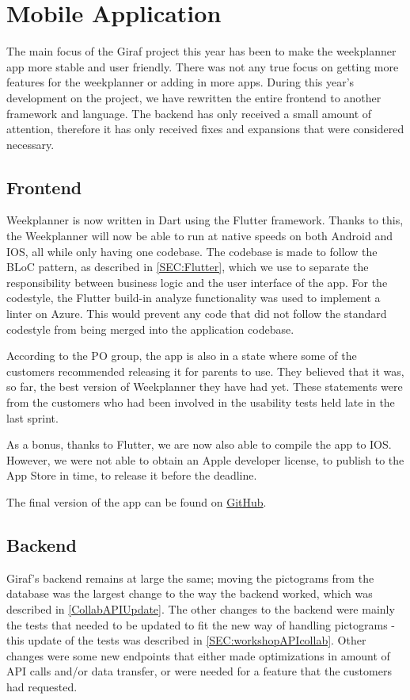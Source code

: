 \section{Mobile Application}
The main focus of the Giraf project this year has been to make the weekplanner app more stable and user friendly.
There was not any true focus on getting more features for the weekplanner or adding in more apps.
During this year's development on the project, we have rewritten the entire frontend to another framework and language.
The backend has only received a small amount of attention, therefore it has only received fixes and expansions that were considered necessary.

\subsection{Frontend}
Weekplanner is now written in Dart using the Flutter framework.
Thanks to this, the Weekplanner will now be able to run at native speeds on both Android and IOS, all while only having one codebase.
The codebase is made to follow the BLoC pattern, as described in \autoref{SEC:Flutter}, which we use to separate the responsibility between business logic and the user interface of the app. 
For the codestyle, the Flutter build-in analyze functionality was used to implement a linter on Azure. 
This would prevent any code that did not follow the standard codestyle from being merged into the application codebase.

According to the PO group, the app is also in a state where some of the customers recommended releasing it for parents to use.
They believed that it was, so far, the best version of Weekplanner they have had yet.
These statements were from the customers who had been involved in the usability tests held late in the last sprint.

As a bonus, thanks to Flutter, we are now also able to compile the app to IOS.
However, we were not able to obtain an Apple developer license, to publish to the App Store in time, to release it before the deadline.

The final version of the app can be found on \href{https://github.com/aau-giraf/weekplanner/tree/2019-Final}{GitHub}.


\subsection{Backend}
Giraf's backend remains at large the same; moving the pictograms from the database was the largest change to the way the backend worked, which was described in \autoref{CollabAPIUpdate}.
The other changes to the backend were mainly the tests that needed to be updated to fit the new way of handling pictograms - this update of the tests was described in \autoref{SEC:workshopAPIcollab}.
Other changes were some new endpoints that either made optimizations in amount of API calls and/or data transfer, or were needed for a feature that the customers had requested.

